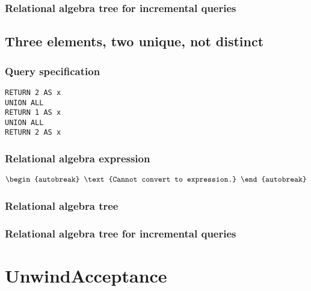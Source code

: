 
\subsubsection*{Relational algebra tree for incremental queries}


\subsection{Three elements, two unique, not distinct}

\subsubsection*{Query specification}

\begin{lstlisting}
RETURN 2 AS x
UNION ALL
RETURN 1 AS x
UNION ALL
RETURN 2 AS x
\end{lstlisting}

\subsubsection*{Relational algebra expression}

\begin{align*}
\begin{autobreak}
\text{Cannot convert to expression.}
\end{autobreak}
\end{align*}

\subsubsection*{Relational algebra tree}


\subsubsection*{Relational algebra tree for incremental queries}

\section{UnwindAcceptance}


